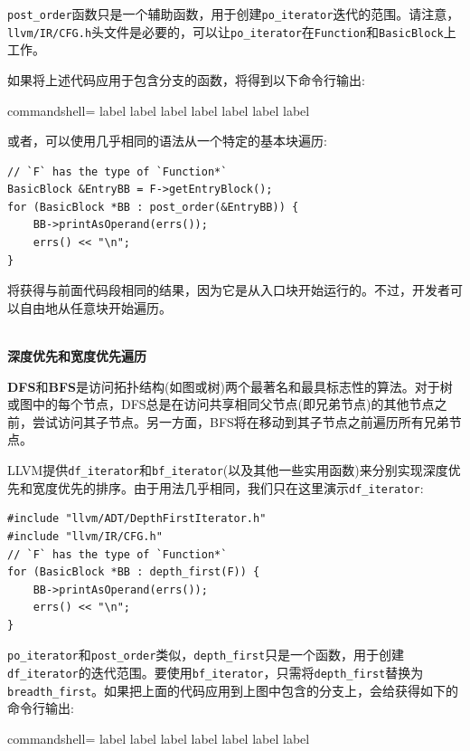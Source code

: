 \texttt{post\_order}函数只是一个辅助函数，用于创建\texttt{po\_iterator}迭代的范围。请注意，\texttt{llvm/IR/CFG.h}头文件是必要的，可以让\texttt{po\_iterator}在\texttt{Function}和\texttt{BasicBlock}上工作。

如果将上述代码应用于包含分支的函数，将得到以下命令行输出:

\begin{tcblisting}{commandshell={}}
label %
label %
label %
label %
label %
label %
label %
\end{tcblisting}

或者，可以使用几乎相同的语法从一个特定的基本块遍历:

\begin{lstlisting}[style=styleCXX]
// `F` has the type of `Function*`
BasicBlock &EntryBB = F->getEntryBlock();
for (BasicBlock *BB : post_order(&EntryBB)) {
	BB->printAsOperand(errs());
	errs() << "\n";
}
\end{lstlisting}

将获得与前面代码段相同的结果，因为它是从入口块开始运行的。不过，开发者可以自由地从任意块开始遍历。

\hspace*{\fill} \\ %
\noindent
\textbf{深度优先和宽度优先遍历}

\textbf{DFS}和\textbf{BFS}是访问拓扑结构(如图或树)两个最著名和最具标志性的算法。对于树或图中的每个节点，DFS总是在访问共享相同父节点(即兄弟节点)的其他节点之前，尝试访问其子节点。另一方面，BFS将在移动到其子节点之前遍历所有兄弟节点。

LLVM提供\texttt{df\_iterator}和\texttt{bf\_iterator}(以及其他一些实用函数)来分别实现深度优先和宽度优先的排序。由于用法几乎相同，我们只在这里演示\texttt{df\_iterator}:

\begin{lstlisting}[style=styleCXX]
#include "llvm/ADT/DepthFirstIterator.h"
#include "llvm/IR/CFG.h"
// `F` has the type of `Function*`
for (BasicBlock *BB : depth_first(F)) {
	BB->printAsOperand(errs());
	errs() << "\n";
}
\end{lstlisting}

\texttt{po\_iterator}和\texttt{post\_order}类似，\texttt{depth\_first}只是一个函数，用于创建\texttt{df\_iterator}的迭代范围。要使用\texttt{bf\_iterator}，只需将\texttt{depth\_first}替换为\texttt{breadth\_first}。如果把上面的代码应用到上图中包含的分支上，会给获得如下的命令行输出:

\begin{tcblisting}{commandshell={}}
label %
label %
label %
label %
label %
label %
label %
\end{tcblisting}

